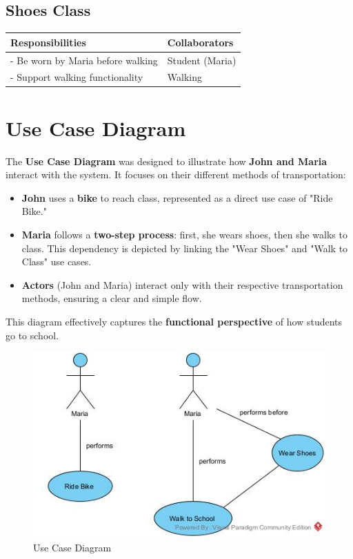 \begin{description}
\subsection{Shoes Class}
\begin{center}
\begin{tabular}{|p{5cm}|p{5cm}|}
    \hline
    \textbf{Responsibilities} & \textbf{Collaborators} \\
    \hline
    - Be worn by Maria before walking & Student (Maria) \\
    - Support walking functionality & Walking \\
    \hline
\end{tabular}
\end{center}
\end{description}
 
\section{Use Case Diagram}
The \textbf{Use Case Diagram} was designed to illustrate how \textbf{John and Maria} interact with the system. It focuses on their different methods of transportation:
\begin{itemize}
    \item \textbf{John} uses a \textbf{bike} to reach class, represented as a direct use case of "Ride Bike."
    \item \textbf{Maria} follows a \textbf{two-step process}: first, she wears shoes, then she walks to class. This dependency is depicted by linking the "Wear Shoes" and "Walk to Class" use cases.
    \item \textbf{Actors} (John and Maria) interact only with their respective transportation methods, ensuring a clear and simple flow.
\end{itemize}
This diagram effectively captures the \textbf{functional perspective} of how students go to school.


\begin{figure}[h]
    \centering
    \includegraphics[scale=0.75]{Book-SSW565/jpg/ArchitectureModeling/Use Case Diagram1.jpg}
    \caption{\label{Figure:::Use Case Diagram}Use Case Diagram}
\end{figure}

